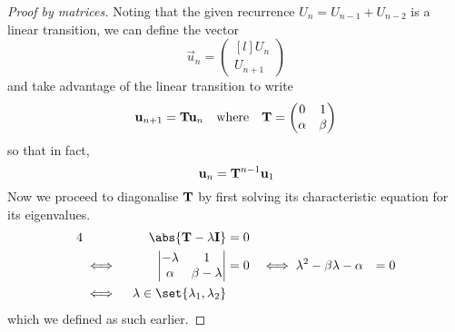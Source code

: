 \begin{proof}[Proof by matrices]
 Noting that the given recurrence \(U_n = U_{n - 1} + U_{n - 2}\) is a linear
 transition, we can define the vector
 \begin{equation*}
  \vec u_n =
   \begin{pmatrix*}[l]
    U_n \\
    U_{n + 1}
   \end{pmatrix*}
 \end{equation*}
 and take advantage of the linear transition to write
 \begin{equation*}
  \mathrm{\mathbf{u}}_{n + 1} = \mathbf{T} \mathrm{\mathbf{u}}_n \quad \text{where} \quad
  \mathbf{T} =
  \begin{pmatrix}
   0 & 1 \\
   \alpha & \beta
  \end{pmatrix}
 \end{equation*}
 so that in fact,
 \begin{equation*}
  \mathrm{\mathbf{u}}_n = \mathbf{T}^{n - 1}\mathrm{\mathbf{u}}_1
 \end{equation*}
 Now we proceed to diagonalise \(\mathbf{T}\) by first solving its
 characteristic equation for its eigenvalues.
 \begin{alignat*}4
  && \abs{\mat T - \lambda \mat I} &= 0 \\
  &\iff{}&
   \begin{vmatrix}
    -\lambda & 1 \\
    \alpha & \beta - \lambda
   \end{vmatrix} &= 0
  &\iff{}& \lambda^2 - \beta \lambda - \alpha &= 0 \\
  &\iff{}& \lambda \in \set{\lambda_1, \lambda_2}
 \end{alignat*}
 which we defined as such earlier.


\end{proof}
